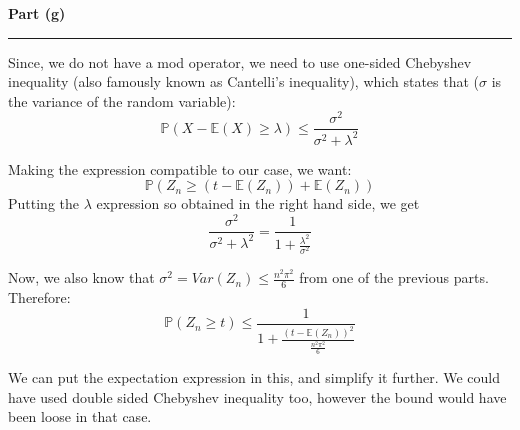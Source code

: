 \documentclass[a4paper,12pt]{article}
\newenvironment{solution}[2][]{%
    \begin{mdframed}[linecolor=blue!70!black, linewidth=2pt, roundcorner=10pt, backgroundcolor=yellow!10!white, skipabove=12pt, skipbelow=12pt]%
        \textbf{\large #2}
        \par\noindent\rule{\textwidth}{0.4pt}
}{
    \end{mdframed}
}
\begin{document}
\begin{solution}{Part (g)}
  Since, we do not have a mod operator, we need to use one-sided Chebyshev inequality (also famously known as Cantelli's inequality), which states that ($\sigma$ is the variance of the random variable):
  \[\mathbb{P}(X - \mathbb{E}(X) \geq \lambda) \leq \frac{\sigma^2}{\sigma^2 + \lambda^2}\]

 Making the expression compatible to our case, we want:
 \[\mathbb{P}\left(Z_n \geq (t - \mathbb{E}(Z_n)) + \mathbb{E}(Z_n)\right)\]
 Putting the $\lambda$ expression so obtained in the right hand side, we get
 \[\frac{\sigma^2}{\sigma^2 + \lambda^2} = \frac{1}{1 + \frac{\lambda^2}{\sigma^2}}\]

 Now, we also know that $\sigma^2 = Var(Z_n) \leq \frac{n^2\pi^2}{6}$ from one of the previous parts. Therefore:
\[\mathbb{P}\left(Z_n \geq t \right) \leq \frac{1}{1 + \frac{(t - \mathbb{E}(Z_n))^2}{\frac{n^2\pi^2}{6}}}\]


We can put the expectation expression in this, and simplify it further. We could have used double sided Chebyshev inequality too, however the bound would have been loose in that case.

\end{solution}
\end{document}
